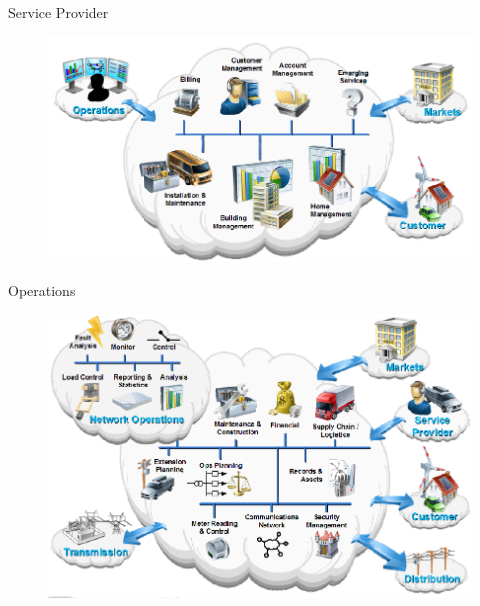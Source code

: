 \begin{frame}[fragile]{Service Provider}
	\begin{figure}[h] 
		\includegraphics[scale=0.45]{imgs/ser.png}
	\end{figure}
\end{frame}


\begin{frame}[fragile]{Operations}
	\begin{figure}[h] 
		\includegraphics[scale=0.45]{imgs/ope.png}
	\end{figure}
\end{frame}


